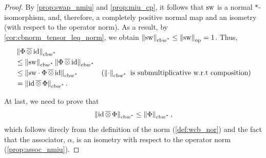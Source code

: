 \begin{proof}
By \autoref{prop:swap_nmiu} and \autoref{prop:miu_cp}, it follows that $\mathrm{sw}$ is a normal $\ast$-isomorphism, and, therefore, a completely positive normal map and an isometry (with respect to the operator norm). As a result, by \autoref{cor:cbnorm_tensor_leq_norm}, we obtain $\left\lVert \mathrm{sw} \right\rVert_{\text{cb$w^*$}} \leq \left\lVert \mathrm{sw} \right\rVert_{\text{op}}=1$. Thus, 
\begin{align*}
  & \left\lVert \Phi \,\overline{\otimes} \, \mathrm{id} \right\rVert_{\text{cb$w^*$}}  \\
  & \leq \left\lVert \mathrm{sw} \right\rVert_{\text{cb$w^*$}} \left\lVert \Phi \,\overline{\otimes} \, \mathrm{id} \right\rVert_{\text{cb$w^*$}}   \\
  & \leq \left\lVert  \mathrm{sw} \cdot \Phi \,\overline{\otimes} \, \mathrm{id} \right\rVert_{\text{cb$w^*$}}  & (\left\lVert \cdot \right\rVert_{\text{cb$w^*$}} \text{ is submultiplicative  w.r.t composition}) \\
& = \left\lVert \mathrm{id} \,\overline{\otimes} \,\Phi \right\rVert_{\text{cb$w^*$}}. 
\end{align*}

At last, we need to prove that
\[
  \left\lVert  \mathrm{id} \,\overline{\otimes} \, \Phi \right\rVert_{\text{cb$w^*$}} \leq \left\lVert \Phi \right\rVert_{\text{cb$w^*$}},
\]  
which follows direcly from the definition of the norm (\autoref{def:wcb_nor}) and the fact that the associator, $\alpha$, is an isometry with respect to the operator norm (\autoref{prop:assoc_nmiu}). 

\end{proof}

